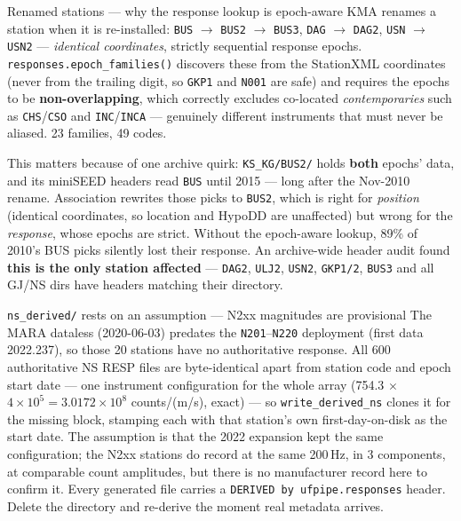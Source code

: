 \documentclass[11pt]{article}
\newcommand{\code}[1]{\texttt{#1}}
\begin{document}
\begin{warnbox}{Renamed stations --- why the response lookup is epoch-aware}
KMA renames a station when it is re-installed: \code{BUS} $\rightarrow$ \code{BUS2} $\rightarrow$ \code{BUS3},
\code{DAG} $\rightarrow$ \code{DAG2}, \code{USN} $\rightarrow$ \code{USN2} --- \emph{identical coordinates},
strictly sequential response epochs. \code{responses.epoch\_families()} discovers these from the StationXML
coordinates (never from the trailing digit, so \code{GKP1} and \code{N001} are safe) and requires the epochs to
be \textbf{non-overlapping}, which correctly excludes co-located \emph{contemporaries} such as \code{CHS}/\code{CSO}
and \code{INC}/\code{INCA} --- genuinely different instruments that must never be aliased. 23 families, 49 codes.

\smallskip
This matters because of one archive quirk: \code{KS\_KG/BUS2/} holds \textbf{both} epochs' data, and its
miniSEED headers read \code{BUS} until 2015 --- long after the Nov-2010 rename. Association rewrites those
picks to \code{BUS2}, which is right for \emph{position} (identical coordinates, so location and HypoDD are
unaffected) but wrong for the \emph{response}, whose epochs are strict. Without the epoch-aware lookup, 89\% of
2010's BUS picks silently lost their response. An archive-wide header audit found \textbf{this is the only
station affected} --- \code{DAG2}, \code{ULJ2}, \code{USN2}, \code{GKP1/2}, \code{BUS3} and all GJ/NS dirs have
headers matching their directory.
\end{warnbox}

\begin{warnbox}{\code{ns\_derived/} rests on an assumption --- N2xx magnitudes are provisional}
The MARA dataless (2020-06-03) predates the \code{N201}--\code{N220} deployment (first data 2022.237), so those 20
stations have no authoritative response. All 600 authoritative NS RESP files are byte-identical apart from
station code and epoch start date --- one instrument configuration for the whole array (754.3 $\times$
$4\!\times\!10^{5} = 3.0172\!\times\!10^{8}$ counts/(m/s), exact) --- so \code{write\_derived\_ns} clones it for
the missing block, stamping each with that station's own first-day-on-disk as the start date. The assumption
is that the 2022 expansion kept the same configuration; the N2xx stations do record at the same 200\,Hz, in
3 components, at comparable count amplitudes, but there is no manufacturer record here to confirm it. Every
generated file carries a \code{DERIVED by ufpipe.responses} header. Delete the directory and re-derive the
moment real metadata arrives.
\end{warnbox}
\end{document}
